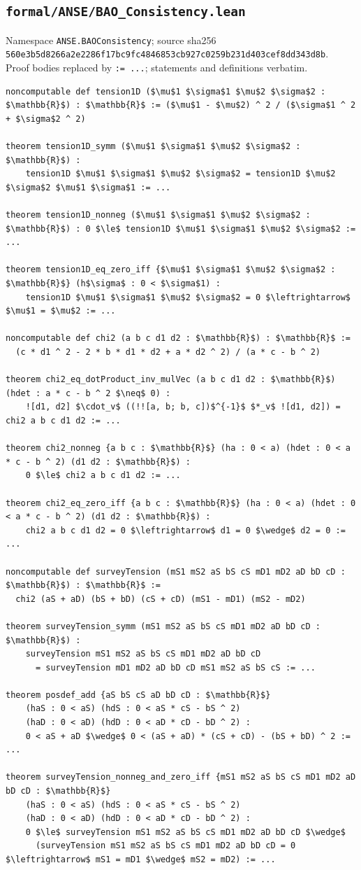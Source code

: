 \subsection*{\texttt{formal/ANSE/BAO\_Consistency.lean}}
Namespace \texttt{ANSE.BAOConsistency}; source sha256\\ {\scriptsize\texttt{560e3b5d8266a2e2286f17bc9fc4846853cb927c0259b231d403cef8dd343d8b}}.\\ Proof bodies replaced by \texttt{:= ...}; statements and definitions verbatim.
\begin{lstlisting}[mathescape]
noncomputable def tension1D ($\mu$1 $\sigma$1 $\mu$2 $\sigma$2 : $\mathbb{R}$) : $\mathbb{R}$ := ($\mu$1 - $\mu$2) ^ 2 / ($\sigma$1 ^ 2 + $\sigma$2 ^ 2)

theorem tension1D_symm ($\mu$1 $\sigma$1 $\mu$2 $\sigma$2 : $\mathbb{R}$) :
    tension1D $\mu$1 $\sigma$1 $\mu$2 $\sigma$2 = tension1D $\mu$2 $\sigma$2 $\mu$1 $\sigma$1 := ...

theorem tension1D_nonneg ($\mu$1 $\sigma$1 $\mu$2 $\sigma$2 : $\mathbb{R}$) : 0 $\le$ tension1D $\mu$1 $\sigma$1 $\mu$2 $\sigma$2 := ...

theorem tension1D_eq_zero_iff {$\mu$1 $\sigma$1 $\mu$2 $\sigma$2 : $\mathbb{R}$} (h$\sigma$ : 0 < $\sigma$1) :
    tension1D $\mu$1 $\sigma$1 $\mu$2 $\sigma$2 = 0 $\leftrightarrow$ $\mu$1 = $\mu$2 := ...

noncomputable def chi2 (a b c d1 d2 : $\mathbb{R}$) : $\mathbb{R}$ :=
  (c * d1 ^ 2 - 2 * b * d1 * d2 + a * d2 ^ 2) / (a * c - b ^ 2)

theorem chi2_eq_dotProduct_inv_mulVec (a b c d1 d2 : $\mathbb{R}$) (hdet : a * c - b ^ 2 $\neq$ 0) :
    ![d1, d2] $\cdot_v$ ((!![a, b; b, c])$^{-1}$ $*_v$ ![d1, d2]) = chi2 a b c d1 d2 := ...

theorem chi2_nonneg {a b c : $\mathbb{R}$} (ha : 0 < a) (hdet : 0 < a * c - b ^ 2) (d1 d2 : $\mathbb{R}$) :
    0 $\le$ chi2 a b c d1 d2 := ...

theorem chi2_eq_zero_iff {a b c : $\mathbb{R}$} (ha : 0 < a) (hdet : 0 < a * c - b ^ 2) (d1 d2 : $\mathbb{R}$) :
    chi2 a b c d1 d2 = 0 $\leftrightarrow$ d1 = 0 $\wedge$ d2 = 0 := ...

noncomputable def surveyTension (mS1 mS2 aS bS cS mD1 mD2 aD bD cD : $\mathbb{R}$) : $\mathbb{R}$ :=
  chi2 (aS + aD) (bS + bD) (cS + cD) (mS1 - mD1) (mS2 - mD2)

theorem surveyTension_symm (mS1 mS2 aS bS cS mD1 mD2 aD bD cD : $\mathbb{R}$) :
    surveyTension mS1 mS2 aS bS cS mD1 mD2 aD bD cD
      = surveyTension mD1 mD2 aD bD cD mS1 mS2 aS bS cS := ...

theorem posdef_add {aS bS cS aD bD cD : $\mathbb{R}$}
    (haS : 0 < aS) (hdS : 0 < aS * cS - bS ^ 2)
    (haD : 0 < aD) (hdD : 0 < aD * cD - bD ^ 2) :
    0 < aS + aD $\wedge$ 0 < (aS + aD) * (cS + cD) - (bS + bD) ^ 2 := ...

theorem surveyTension_nonneg_and_zero_iff {mS1 mS2 aS bS cS mD1 mD2 aD bD cD : $\mathbb{R}$}
    (haS : 0 < aS) (hdS : 0 < aS * cS - bS ^ 2)
    (haD : 0 < aD) (hdD : 0 < aD * cD - bD ^ 2) :
    0 $\le$ surveyTension mS1 mS2 aS bS cS mD1 mD2 aD bD cD $\wedge$
      (surveyTension mS1 mS2 aS bS cS mD1 mD2 aD bD cD = 0 $\leftrightarrow$ mS1 = mD1 $\wedge$ mS2 = mD2) := ...
\end{lstlisting}

